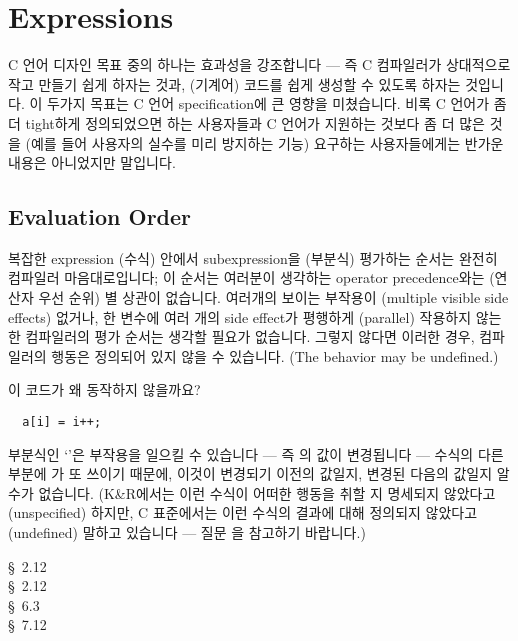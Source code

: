 \chapter{Expressions}	\label{chap:expr}

C 언어 디자인 목표 중의 하나는 효과성을 강조합니다 --- 즉 C 컴파일러가
상대적으로 작고 만들기 쉽게 하자는 것과, (기계어) 코드를 쉽게 생성할 수
있도록 하자는 것입니다.  이 두가지 목표는 C 언어 specification에 큰 영향을
미쳤습니다.  비록 C 언어가 좀 더 tight하게 정의되었으면 하는 사용자들과
C 언어가 지원하는 것보다 좀 더 많은 것을 (예를 들어 사용자의 실수를 미리
방지하는 기능) 요구하는 사용자들에게는 반가운 내용은 아니었지만 말입니다.

\section{Evaluation Order}
복잡한 expression (수식) 안에서 subexpression을 (부분식) 평가하는 순서는
완전히 컴파일러 마음대로입니다; 이 순서는 여러분이 생각하는
operator precedence와는 (연산자 우선 순위) 별 상관이 없습니다.
여러개의 보이는 부작용이 (multiple visible side effects) 없거나,
한 변수에 여러 개의 side effect가 평행하게 (parallel) 작용하지 않는 한
컴파일러의 평가 순서는 생각할 필요가 없습니다.  그렇지 않다면 이러한 경우,
컴파일러의 행동은 정의되어 있지 않을 수 있습니다. (The behavior may be
undefined.)


\begin{faq}
	이 코드가 왜 동작하지 않을까요?

\begin{verbatim}
  a[i] = i++;
\end{verbatim}

\A
	부분식인 `'은 부작용을 일으킬 수 있습니다 --- 즉 의
	값이 변경됩니다 --- 수식의 다른 부분에 가 또 쓰이기 때문에,
	이것이 변경되기 이전의 값일지, 변경된 다음의 값일지 알 수가
	없습니다.  (K\&R에서는 이런 수식이 어떠한 행동을 취할 지 명세되지
	않았다고(unspecified) 하지만, C 표준에서는 이런 수식의 결과에 대해
	정의되지 않았다고(undefined)  말하고 있습니다 ---
	질문 을 참고하기 바랍니다.)

\R
	\cite{kr1} \S\ 2.12 \\
	\cite{kr2} \S\ 2.12 \\
	\cite{c89} \S\ 6.3 \\
	\cite{hs} \S\ 7.12 
\end{faq}

